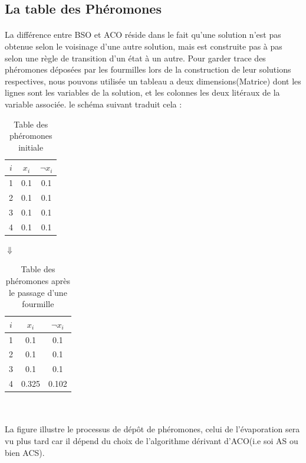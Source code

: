 	
	\subsection{La table des Phéromones}
	\paragraph{}
	La différence entre BSO et ACO réside dans le fait qu'une solution n'est pas obtenue selon le voisinage d'une autre solution, mais est construite pas à pas selon une règle de transition d'un état à un autre. Pour garder trace des phéromones déposées par les fourmilles lors de la construction de leur solutions respectives, nous pouvons utilisée un tableau a deux dimensions(Matrice) dont les lignes sont les variables de la solution, et les colonnes les deux litéraux de la variable associée. le schéma suivant traduit cela : 
	
	\begin{minipage}{\textwidth}
		\centering
		\begin{table}[H]
			\centering
			\begin{tabular}{|c|c|c|}
				\hline
				$i$ & $x_{i}$ & $\lnot x_{i}$ \\ \hline
				1   & 0.1     & 0.1           \\ \hline
				2   & 0.1     & 0.1           \\ \hline
				3   & 0.1     & 0.1           \\ \hline
				4   & 0.1     & 0.1           \\ \hline
			\end{tabular}
			\caption{Table des phéromones initiale}
		\end{table}
		$\Downarrow$
		\begin{table}[H]
			\centering
			\begin{tabular}{|c|c|c|}
				\hline
				$i$ & $x_{i}$ & $\lnot x_{i}$ \\ \hline
				1   & 0.1     & 0.1           \\ \hline
				2   & 0.1     & 0.1           \\ \hline
				3   & 0.1     & 0.1           \\ \hline
				4   & \cellcolor{green}0.325     & \cellcolor{red!60}0.102           \\ \hline
			\end{tabular}
			\caption{Table des phéromones après le passage d'une fourmille}
		\end{table}
	\end{minipage}
	\\~\\
	La figure illustre le processus de dépôt de phéromones, celui de l'évaporation sera vu plus tard car il dépend du choix de l'algorithme dérivant d'ACO(i.e soi AS ou bien ACS).
